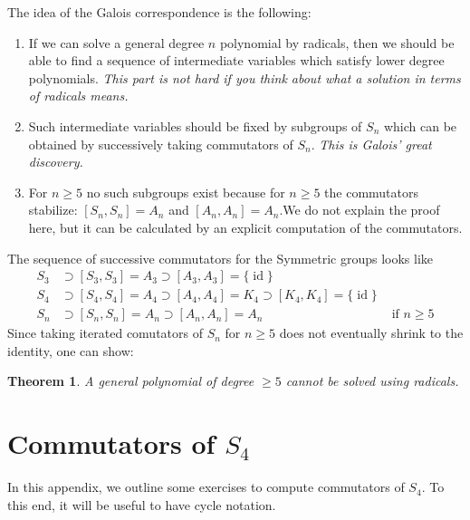 \documentclass[reqno, 12pt, letter]{article}
\theoremstyle{plain}
\newtheorem{theorem}{Theorem}[section]
\theoremstyle{definition}
\theoremstyle{remark}
\numberwithin{equation}{section}
\DeclareMathOperator\id{id}
\begin{document}
			The idea of the Galois correspondence is the following:
			\begin{enumerate}
				\item If we can solve a general degree $ n$ polynomial by radicals, then we should be able to find a sequence of intermediate variables which satisfy lower degree polynomials. 
				\emph{This part is not hard if you think about what a solution in terms of radicals means.}
				\item Such intermediate variables should be fixed by subgroups of $ S_n$ which can be obtained by successively taking commutators of $ S_n$. \emph{This is Galois' great discovery.} 
				\item For $ n \ge 5$ no such subgroups exist because for $ n \ge 5$ the commutators stabilize: $[S_n, S_n] = A_n$ and $ [A_n, A_n] = A_n$.We do not explain the proof here, but it can be calculated by an explicit computation of the commutators.
			\end{enumerate}
      
      The sequence of successive commutators for the Symmetric groups looks like
      \begin{align*}
	      S_3 &\supset [S_3, S_3] = A_3 \supset [A_3, A_3] = \{ \id \}  &\\
		S_4 &\supset [S_4, S_4] = A_4 \supset [A_4, A_4] = K_4 \supset [K_4, K_4] = \{ \id \} & \\
		S_n &\supset [S_n, S_n] = A_n \supset [A_n, A_n] = A_n      & \text{ if } n \geq 5
\end{align*}
	Since taking iterated comutators of $S_n$ for $n \geq 5$ does not eventually shrink to the identity,
	one can show:
			\begin{theorem}
				A general polynomial of degree $ \ge 5$ cannot be solved using radicals.
			\end{theorem}
		
\newpage
\appendix
\section{Commutators of $S_4$}
\label{appendix:commutators-s4}
In this appendix, we outline some exercises to compute commutators of $S_4$.
To this end, it will be useful to have cycle notation.
\end{document}
